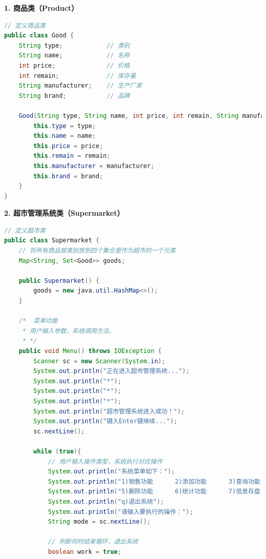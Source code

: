 \documentclass[12pt, a4paper, oneside]{ctexart}
\begin{document}
\textbf{1. 商品类（Product）}
\begin{lstlisting}[language=Java, breaklines=true]
// 定义商品类
public class Good {
    String type;            // 类别
    String name;            // 名称
    int price;              // 价格
    int remain;             // 库存量
    String manufacturer;    // 生产厂家
    String brand;           // 品牌

    Good(String type, String name, int price, int remain, String manufacturer, String brand) {
        this.type = type;
        this.name = name;
        this.price = price;
        this.remain = remain;
        this.manufacturer = manufacturer;
        this.brand = brand;
    }
}
\end{lstlisting}

\textbf{2. 超市管理系统类（Supermarket）}
\begin{lstlisting}[language=Java, breaklines=true]
// 定义超市类
public class Supermarket {
    // 将所有商品按类别放到四个集合里作为超市的一个元素
    Map<String, Set<Good>> goods;

    public Supermarket() {
        goods = new java.util.HashMap<>();
    }

    /*  菜单功能
     * 用户输入参数，系统调用方法。
     * */
    public void Menu() throws IOException {
        Scanner sc = new Scanner(System.in);
        System.out.println("正在进入超市管理系统...");
        System.out.println("*");
        System.out.println("*");
        System.out.println("*");
        System.out.println("超市管理系统进入成功！");
        System.out.println("键入Enter键继续...");
        sc.nextLine();

        while (true){
            // 用户输入操作类型，系统执行对应操作
            System.out.println("系统菜单如下：");
            System.out.println("1)销售功能      2)添加功能      3)查询功能      4)修改功能");
            System.out.println("5)删除功能      6)统计功能      7)信息存盘      8)信息读取");
            System.out.println("q)退出系统");
            System.out.println("请输入要执行的操作：");
            String mode = sc.nextLine();

            // 判断何时结束循环，退出系统
            boolean work = true;


\end{lstlisting}
\end{document}
